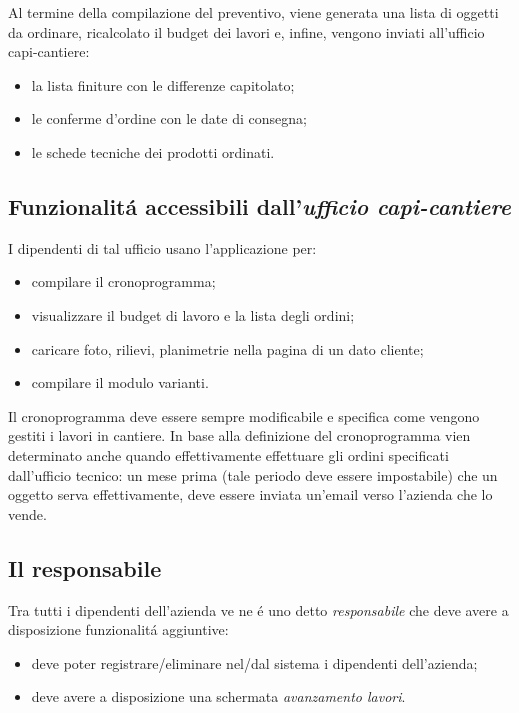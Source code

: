 \documentclass[paper=a4, fontsize=11pt]{scrartcl} %
\numberwithin{equation}{section} %
\numberwithin{figure}{section} %
\numberwithin{table}{section} %
\begin{document}
Al termine della compilazione del preventivo, viene generata una lista di oggetti da
ordinare, ricalcolato il budget dei lavori e, infine, vengono inviati all'ufficio capi-cantiere:
\begin{itemize}
\item la lista finiture con le differenze capitolato;
\item le conferme d'ordine con le date di consegna;
\item le schede tecniche dei prodotti ordinati.
\end{itemize}

\subsection{Funzionalit\'a accessibili dall'\textit{ufficio capi-cantiere}}

I dipendenti di tal ufficio usano l'applicazione per:
\begin{itemize}
\item compilare il cronoprogramma;
\item visualizzare il budget di lavoro e la lista degli ordini;
\item caricare foto, rilievi, planimetrie nella pagina di un dato cliente;
\item compilare il modulo varianti.
\end{itemize}

Il cronoprogramma deve essere sempre modificabile e specifica come vengono
gestiti i lavori in cantiere.
In base alla definizione del cronoprogramma vien determinato anche quando effettivamente
effettuare gli ordini specificati dall'ufficio tecnico: un mese prima (tale periodo
deve essere impostabile) che un oggetto serva effettivamente, deve essere inviata
un'email verso l'azienda che lo vende.

\subsection{Il responsabile}

Tra tutti i dipendenti dell'azienda ve ne \'e uno detto \textit{responsabile}
che deve avere a disposizione funzionalit\'a aggiuntive:
\begin{itemize}
\item deve poter registrare/eliminare nel/dal sistema i dipendenti dell'azienda;
\item deve avere a disposizione una schermata  \textit{avanzamento lavori}.
\end{itemize}
\end{document}
